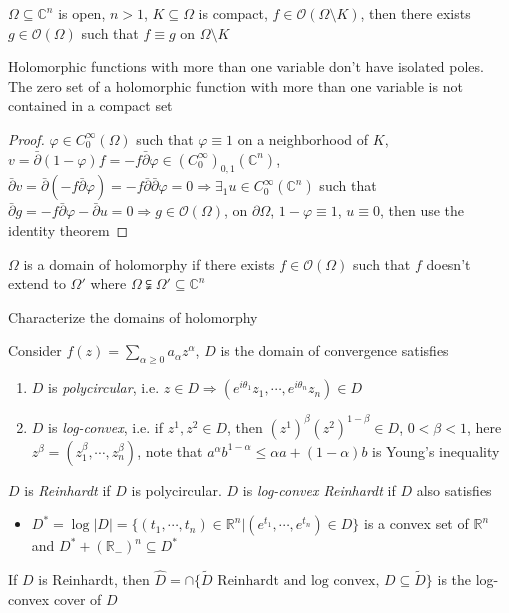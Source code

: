 \documentclass[../main.tex]{subfiles}
\begin{document}
\begin{theorem}
$\Omega\subseteq\mathbb C^n$ is open, $n>1$, $K\subseteq\Omega$ is compact, $f\in\mathcal O(\Omega\setminus K)$, then there exists $g\in\mathcal O(\Omega)$ such that $f\equiv g$ on $\Omega\setminus K$
\end{theorem}

\begin{remark}
Holomorphic functions with more than one variable don't have isolated poles. The zero set of a holomorphic function with more than one variable is not contained in a compact set
\end{remark}

\begin{proof}
$\varphi\in C^\infty_0(\Omega)$ such that $\varphi\equiv1$ on a neighborhood of $K$, $v=\bar\partial(1-\varphi)f=-f\bar\partial\varphi\in(C^\infty_0)_{0,1}(\mathbb C^n)$, $\bar\partial v=\bar\partial(-f\bar\partial\varphi)=-f\bar\partial\bar\partial \varphi=0\Rightarrow\exists_1 u\in C^\infty_0(\mathbb C^n)$ such that $\bar\partial g=-f\bar\partial\varphi-\bar\partial u=0\Rightarrow g\in\mathcal O(\Omega)$, on $\partial\Omega$, $1-\varphi\equiv1$, $u\equiv0$, then use the identity theorem
\end{proof}

\begin{definition}
$\Omega$ is a domain of holomorphy if there exists $f\in\mathcal O(\Omega)$ such that $f$ doesn't extend to $\Omega'$ where $\Omega\subsetneqq\Omega'\subseteq\mathbb C^n$
\end{definition}

\begin{question}
Characterize the domains of holomorphy
\end{question}

Consider $f(z)=\sum_{\alpha\geq0}a_{\alpha}z^\alpha$, $D$ is the domain of convergence satisfies
\begin{enumerate}
\item $D$ is \textit{polycircular}, i.e. $z\in D\Rightarrow(e^{i\theta_1}z_1,\cdots,e^{i\theta_n}z_n)\in D$
\item $D$ is \textit{log-convex}, i.e. if $z^1,z^2\in D$, then $(z^1)^\beta(z^2)^{1-\beta}\in D$, $0<\beta<1$, here $z^\beta=(z_1^\beta,\cdots,z_n^\beta)$, note that $a^\alpha b^{1-\alpha}\leq\alpha a+(1-\alpha)b$ is Young's inequality
\end{enumerate}

\begin{definition}
$D$ is \textit{Reinhardt} if $D$ is polycircular. $D$ is \textit{log-convex Reinhardt} if $D$ also satisfies
\begin{itemize}
\item $D^*=\log|D|=\{(t_1,\cdots,t_n)\in\mathbb R^n|(e^{t_1},\cdots,e^{t_n})\in D\}$ is a convex set of $\mathbb R^n$ and $D^*+(\mathbb R_-)^n\subseteq D^*$
\end{itemize}
If $D$ is Reinhardt, then $\hat D=\cap\{\tilde D\text{ Reinhardt and log convex, }D\subseteq\tilde D\}$ is the log-convex cover of $D$
\end{definition}
\end{document}
